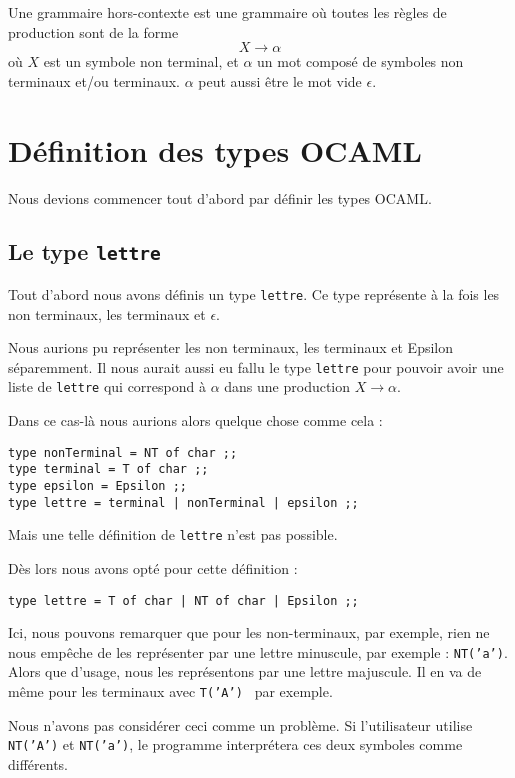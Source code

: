 \documentclass[11pt,a4paper]{article}
\def\code#1{\texttt{#1}} %
\begin{document}
Une grammaire hors-contexte est une grammaire où toutes les
règles de production sont de la forme \[ X \rightarrow \alpha \]
où $X$ est un symbole non terminal, et $\alpha$ un mot composé
de symboles non terminaux et/ou terminaux. $\alpha$ peut aussi
être le mot vide $\epsilon$.
\newpage


\section{Définition des types OCAML}

Nous devions commencer tout d'abord par définir les types OCAML.
\newline

\subsection{Le type \code{lettre}}
Tout d'abord nous avons définis un type \code{lettre}. Ce type
représente à la fois les non terminaux, les terminaux et $\epsilon$.

Nous aurions pu représenter les non terminaux, les terminaux et
Epsilon séparemment. Il nous aurait aussi eu fallu le type \code{lettre}
pour pouvoir avoir une liste de \code{lettre} qui correspond à $\alpha$
dans une production $X \rightarrow \alpha$.

Dans ce cas-là nous aurions alors quelque chose comme cela :
\begin{verbatim}
type nonTerminal = NT of char ;;
type terminal = T of char ;;
type epsilon = Epsilon ;;
type lettre = terminal | nonTerminal | epsilon ;;
\end{verbatim}

Mais une telle définition de \code{lettre} n'est pas possible.

Dès lors nous avons opté pour cette définition :
\begin{verbatim}
type lettre = T of char | NT of char | Epsilon ;;
\end{verbatim}

Ici, nous pouvons remarquer que pour les non-terminaux,
par exemple, rien ne nous empêche de les représenter par
une lettre minuscule, par exemple : \code{NT('a')}.
Alors que d'usage,
nous les représentons par une lettre majuscule.
Il en va de même pour les terminaux avec \code{T('A') } par
exemple.

Nous n'avons pas considérer ceci comme un problème. Si
l'utilisateur utilise \code{NT('A')} et \code{NT('a')}, le
programme interprétera ces deux symboles comme différents.
\end{document}
